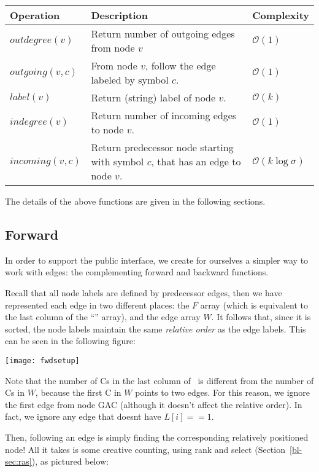 \begin{center}
\small
\begin{tabularx}{\textwidth}{@{}lXl@{}}
\toprule  
{\bf Operation} & {\bf Description} & {\bf Complexity}\\
\midrule  
$\textit{outdegree}(v)$ & Return number of outgoing edges from node $v$ & $\mathcal{O}(1)$\\
$\textit{outgoing}(v,c)$ & From node $v$, follow the edge labeled by symbol $c$. & $\mathcal{O}(1)$\\	
$\textit{label}(v)$ & Return (string) label of node $v$. & $\mathcal{O}(k)$\\
$\textit{indegree}(v)$ & Return number of incoming edges to node $v$. & $\mathcal{O}(1)$\\
$\textit{incoming}(v,c)$ & Return predecessor node starting with symbol $c$, that has an edge to node $v$. & $\mathcal{O}(k\log\sigma)$\\
\bottomrule
\end{tabularx}
\end{center}

The details of the above functions are given in the following sections.

\subsection{Forward}\label{bl-sec:fwd}

In order to support the public interface, we create for ourselves a simpler way to work with edges: the complementing forward and backward functions.

Recall that all node labels are defined by predecessor edges, then we have represented each edge in two different places: the $F$ array (which is equivalent to the last column of the ``\Node'' array), and the edge array $W$. It follows that, since it is sorted, the node labels maintain the same \emph{relative order} as the edge labels. This can be seen in the following figure:

\medskip\centerline{\texttt{[image: fwdsetup]}}\medskip

Note that the number of Cs in the last column of \Node\ is different from the number of Cs in $W$, because the first C in $W$ points to two edges. For this reason, we ignore the first edge from node GAC (although it doesn't affect the relative order). In fact, we ignore any edge that doesnt have $L[i] == 1$.

Then, following an edge is simply finding the corresponding relatively positioned node! All it takes is some creative counting, using rank and select (Section~\ref{bl-sec:ras}), as pictured below:

